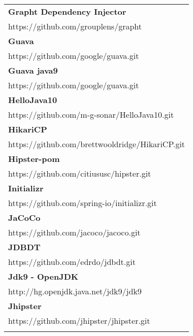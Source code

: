 \begin{table}[]
\small
\begin{tabular}{|p{130mm}|}
\hline 
\bf Grapht Dependency Injector                         \\ https://github.com/grouplens/grapht                                          \\ \hline \bf
Guava                                              \\ https://github.com/google/guava.git                                          \\ \hline \bf
Guava java9                                       \\ https://github.com/google/guava.git                                          \\ \hline \bf
HelloJava10                                        \\ https://github.com/m-g-sonar/HelloJava10.git                                 \\ \hline \bf
HikariCP                                           \\ https://github.com/brettwooldridge/HikariCP.git                              \\ \hline \bf
Hipster-pom                                        \\ https://github.com/citiususc/hipster.git                                     \\ \hline \bf
Initializr                                         \\ https://github.com/spring-io/initializr.git                                  \\ \hline \bf
JaCoCo                                             \\ https://github.com/jacoco/jacoco.git                                         \\ \hline \bf
JDBDT                                              \\ https://github.com/edrdo/jdbdt.git                                           \\ \hline \bf
Jdk9 - OpenJDK                                               \\ http://hg.openjdk.java.net/jdk9/jdk9                                         \\ \hline \bf
Jhipster                                           \\ https://github.com/jhipster/jhipster.git                                     \\ \hline \bf

\end{tabular}
\end{table}
